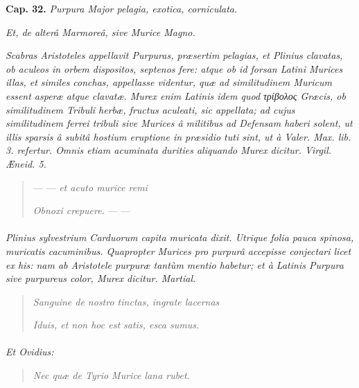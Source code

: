 \documentclass[a4paper, 11pt, oneside, polutonikogreek, german]{article}
\begin{document}
\textbf{Cap. 32.} \emph{Purpura Major pelagia, exotica, corniculata.}

\emph{Et, de alterâ Marmoreâ, sive Murice Magno.}

\emph{Scabras Aristoteles appellavit Purpuras, præsertim pelagias, et Plinius clavatas, ob aculeos in orbem dispositos, septenos fere: atque ob id forsan Latini Murices illas, et similes conchas, appellasse videntur, quæ ad similitudinem Muricum essent asperæ atque clavatæ. Murex enim Latinis idem quod τρίβολος Græcis, ob similitudinem Tribuli herbæ, fructus aculeati, sic appellata; ad cujus similitudinem ferrei tribuli sive Murices â militibus ad Defensam haberi solent, ut illis sparsis â subitâ hostium eruptione in præsidio tuti sint, ut à Valer. Max. lib. 3. refertur. Omnis etiam acuminata durities aliquando Murex dicitur. Virgil. Æneid. 5.}
\begin{quotation}
--- --- \emph{et acuto murice remi}

\emph{Obnoxi crepuere.} --- ---
\end{quotation}
\paragraph{}
\emph{Plinius sylvestrium Carduorum capita muricata dixit. Utrique folia pauca spinosa, muricatis cacuminibus. Quapropter Murices pro purpurâ accepisse conjectari licet ex his: nam ab Aristotele purpuræ tantùm mentio habetur; et à Latinis Purpura sive purpureus color, Murex dicitur. Martial.}
\begin{quotation}
\emph{Sanguine de nostro tinctas, ingrate lacernas}

\emph{Iduis, et non hoc est satis, esca sumus.}
\end{quotation}
\paragraph{}
\emph{Et Ovidius:}
\begin{quotation}
\emph{Nec quæ de Tyrio Murice lana rubet.}
\end{quotation}
\end{document}
